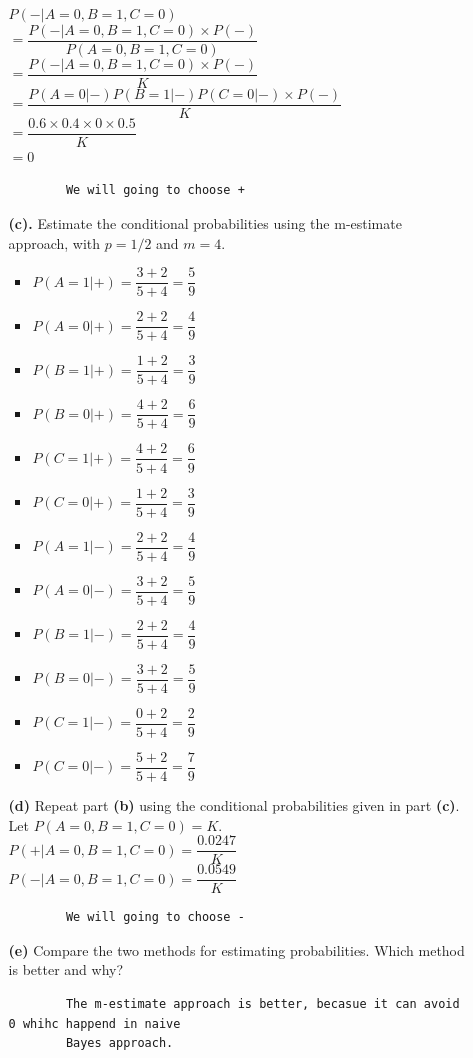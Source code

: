 \documentclass{article}
\begin{document}
\begin{itemize}
\begin{itemize}
		$  P(-|A = 0,B = 1, C = 0) $\\
		$= \dfrac{ P(-|A = 0,B = 1, C = 0)\times P(-)}{ P(A = 0,B = 1, C = 0)}$\\
		$=\dfrac{P(-|A = 0,B = 1, C = 0)\times P(-)}{K}$\\
		$=\dfrac{P(A = 0|-)P(B = 1|-)P(C = 0|-) \times P(-)}{K}$\\
		$=\dfrac{0.6 \times 0.4 \times 0 \times 0.5}{K}$\\
		$=0$\\
		\begin{verbatim}
		We will going to choose +
		\end{verbatim}
		\pagebreak
		\item[\textbf{(c).}] Estimate the conditional probabilities using the m-estimate approach, with $p = 1/2$ and $m = 4$.
		\begin{itemize}
			\item  $P(A = 1|+) = \dfrac{3 + 2}{5 + 4} = \dfrac{5}{9}$
			\item  $P(A = 0|+) = \dfrac{2 + 2}{5 + 4} = \dfrac{4}{9}$
			\item  $P(B = 1|+) = \dfrac{1 + 2}{5 + 4} = \dfrac{3}{9}$
			\item  $P(B = 0|+) = \dfrac{4 + 2}{5 + 4} = \dfrac{6}{9}$
			\item  $P(C = 1|+) = \dfrac{4 + 2}{5 + 4} = \dfrac{6}{9}$
			\item  $P(C = 0|+) = \dfrac{1 + 2}{5 + 4} = \dfrac{3}{9}$
			\item  $P(A = 1|-) = \dfrac{2 + 2}{5 + 4} = \dfrac{4}{9}$
			\item  $P(A = 0|-) = \dfrac{3 + 2}{5 + 4} = \dfrac{5}{9}$
			\item  $P(B = 1|-) = \dfrac{2 + 2}{5 + 4} = \dfrac{4}{9}$
			\item  $P(B = 0|-) = \dfrac{3 + 2}{5 + 4} = \dfrac{5}{9}$
			\item  $P(C = 1|-) = \dfrac{0 + 2}{5 + 4} = \dfrac{2}{9}$
			\item  $P(C = 0|-) = \dfrac{5 + 2}{5 + 4} = \dfrac{7}{9}$
		\end{itemize}
		\item[\textbf{(d)}] Repeat part \textbf{(b)} using the conditional probabilities given in part \textbf{(c)}.
		Let $ P(A = 0,B = 1, C = 0) = K $.\\
		$  P(+|A = 0,B = 1, C = 0) =\dfrac{0.0247}{K}$\\
		$  P(-|A = 0,B = 1, C = 0) =\dfrac{0.0549}{K}$\\
		\begin{verbatim}
		We will going to choose -
		\end{verbatim}
		\item[\textbf{(e)}] Compare the two methods for estimating probabilities. Which method is better and why?
		\begin{verbatim}
		The m-estimate approach is better, becasue it can avoid 0 whihc happend in naive 
		Bayes approach.
		\end{verbatim}
	\end{itemize}
\end{itemize}
\end{document}
